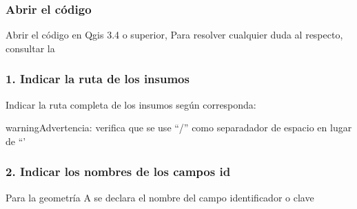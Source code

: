 \documentclass[letterpaper,10pt,spanish]{sphinxmanual}
\begin{document}
\subsubsection{Abrir el código}
\label{\detokenize{tabulacion_3geo:abrir-el-codigo}}
Abrir el código  en Qgis 3.4 o superior,
Para resolver cualquier duda al respecto, consultar la 

\noindent{}


\subsubsection{1. Indicar la ruta de los insumos}
\label{\detokenize{tabulacion_3geo:indicar-la-ruta-de-los-insumos}}
Indicar la ruta completa de los insumos según corresponda:

\begin{sphinxadmonition}{warning}{Advertencia:}
verifica que se use “/” como separadador de espacio en lugar de “'
\end{sphinxadmonition}

\begin{sphinxVerbatim}[commandchars=\\\{\}]
  
  
  
\end{sphinxVerbatim}


\subsubsection{2. Indicar los nombres de los campos id}
\label{\detokenize{tabulacion_3geo:indicar-los-nombres-de-los-campos-id}}
Para la geometría A se declara el nombre del campo identificador o clave

\begin{sphinxVerbatim}[commandchars=\\\{\}]
  
\end{sphinxVerbatim}
\end{document}

